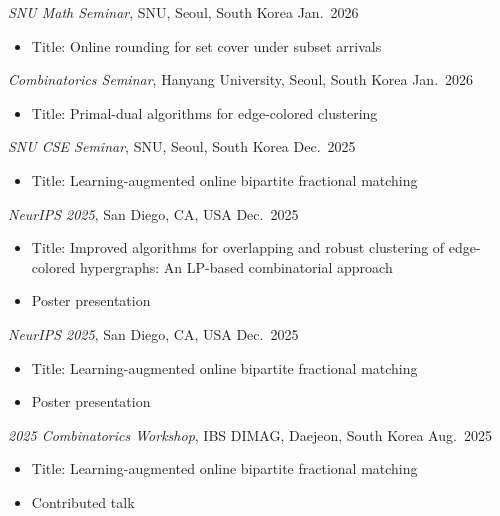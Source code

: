 \documentclass{article}
\newcommand{\killinitspace}{-0.7em}
\begin{document}
\textsl{SNU Math Seminar}, SNU, Seoul, South Korea \hfill Jan.~2026
\vspace{\killinitspace}
\begin{itemize}
\item Title: Online rounding for set cover under subset arrivals
\end{itemize}

\textsl{Combinatorics Seminar}, Hanyang University, Seoul, South Korea \hfill Jan.~2026
\vspace{\killinitspace}
\begin{itemize}
\item Title: Primal-dual algorithms for edge-colored clustering
\end{itemize}

\textsl{SNU CSE Seminar}, SNU, Seoul, South Korea \hfill Dec.~2025
\vspace{\killinitspace}
\begin{itemize}
\item Title: Learning-augmented online bipartite fractional matching
\end{itemize}

\textsl{NeurIPS 2025}, San Diego, CA, USA \hfill Dec.~2025
\vspace{\killinitspace}
\begin{itemize}
\item Title: Improved algorithms for overlapping and robust clustering of edge-colored hypergraphs: An LP-based combinatorial approach
\item Poster presentation
\end{itemize}

\textsl{NeurIPS 2025}, San Diego, CA, USA \hfill Dec.~2025
\vspace{\killinitspace}
\begin{itemize}
\item Title: Learning-augmented online bipartite fractional matching
\item Poster presentation
\end{itemize}

\textsl{2025 Combinatorics Workshop}, IBS DIMAG, Daejeon, South Korea \hfill Aug.~2025
\vspace{\killinitspace}
\begin{itemize}
\item Title: Learning-augmented online bipartite fractional matching
\item Contributed talk
\end{itemize}
\end{document}

